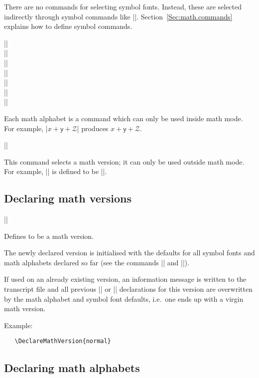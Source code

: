 \documentclass{ltxguide}[1995/11/28]
\begin{document}
There are no commands for selecting symbol fonts.  Instead, these are
selected indirectly through symbol commands like |\oplus|.
Section~\ref{Sec:math.commands} explains how to define symbol commands.
 
\begin{decl}
      ||\\
      ||\\
      ||\\
      ||\\
      ||\\
      ||\\
      ||
\end{decl}
Each math alphabet is a command which can only be used inside math
mode.  For example, |$x + \mathsf{y} + \mathcal{Z}$| produces $x +
\mathsf{y} + \mathcal{Z}$.
 
\begin{decl}
||
\end{decl}
This command selects a math version; it can only be used outside math
mode.  For example, |\boldmath| is defined to be ||.
 
\subsection{Declaring math versions}
 
\begin{decl}
|\DeclareMathVersion| 
\end{decl}
 
Defines  to be a math version.
 
The newly declared version is initialised with the defaults for all
symbol fonts and math alphabets declared so far (see the commands
|\DeclareSymbolFont| and |\DeclareMathAlphabet|).
 
If used on an already existing version, an information message is
written to the transcript file and all previous |\SetSymbolFont| or
|\SetMathAlphabet| declarations for this version are overwritten by
the math alphabet and symbol font defaults, i.e.~one ends up with a
virgin math version.
 
Example:
\begin{verbatim}
   \DeclareMathVersion{normal}
\end{verbatim}
 
 
\subsection{Declaring math alphabets}
\end{document}
